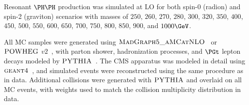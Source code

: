 Resonant $\HH$ production was simulated at LO for both spin-0 (radion) and spin-2 (graviton)
scenarios with masses of $250$, $260$, $270$, $280$, $300$, $320$, $350$, $400$, $450$, $500$, $550$, $600$,
$650$, $700$, $750$, $800$, $850$, $900$, and $1000\GeV$.

All MC samples were generated using $\textsc{MadGraph5\_aMCatNLO}$~\cite{Alwall:2014hca} or
$\textsc{POWHEG}$ $v2$~\cite{Nason:2004rx,Frixione:2007vw,Alioli:2010xd}, with parton shower, hadronization
processes, and $\PGt$ lepton decays modeled by
$\textsc{PYTHIA}$~\cite{PYTHIA_CUETP8M1tune_CMS,PYTHIA_CUETP8M2tune_CMS,Sirunyan:2019dfx,PYTHIA_MonashTune}.
The CMS apparatus was modeled in detail using $\textsc{geant4}$~\cite{Agostinelli:2002hh}, and simulated events
were reconstructed using the same procedure as in data.  Additional collisions were generated with $\textsc{PYTHIA}$ and
overlaid on all MC events, with weights used to match the collision multiplicity distribution in data.

